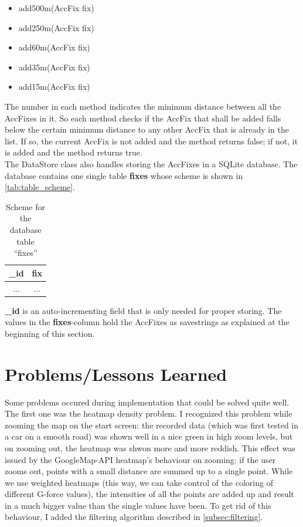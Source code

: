 \documentclass[10pt,a4paper]{article} %
\begin{document}
	\begin{itemize}
		\item add500m(AccFix fix)
		\item add250m(AccFix fix)
		\item add60m(AccFix fix)
		\item add35m(AccFix fix)
		\item add15m(AccFix fix)
	\end{itemize}

	The number in each method indicates the minimum distance between all the AccFixes in it. 
	So each method checks if the AccFix that shall be added falls below the certain minimum distance to any other AccFix that is already in the list.
	If so, the current AccFix is not added and the method returns false; if not, it is added and the method returns true.\\

	The DataStore class also handles storing the AccFixes in a SQLite database.
	The database contains one single table \textbf{fixes} whose scheme is shown in \autoref{tab:table_scheme}.

	\begin{table}[H]
	  \centering
   
	  \begin{tabular}{c|c}
	   \_id & fix \\
	    \hline
	    	... & ...\\
	  \end{tabular}
	   \caption{Scheme for the database table ``fixes''} 
	   \label{tab:table_scheme}
	\end{table}

	\textbf{\_id} is an auto-incrementing field that is only needed for proper storing.
	The values in the \textbf{fixes}-column hold the AccFixes as savestrings as explained at the beginning of this section.
	
	\section{Problems/Lessons Learned}\label{sec:problems}

	Some problems occured during implementation that could be solved quite well.\\
	The first one was the heatmap density problem.
	I recognized this problem while zooming the map on the start screen: the recorded data (which was first tested in a car on a smooth road) was shown well in a nice green in high zoom levels, but on zooming out, the heatmap was shwon more and more reddish.
	This effect was issued by the GoogleMap-API heatmap's behaviour on zooming: if the user zooms out, points with a small distance are summed up to a single point.
	While we use weighted heatmaps (this way, we can take control of the coloring of different G-force values), the intensities of all the points are added up and result in a much bigger value than the single values have been.
	To get rid of this behaviour, I added the filtering algorithm described in \autoref{subsec:filtering}.\\
\end{document}
